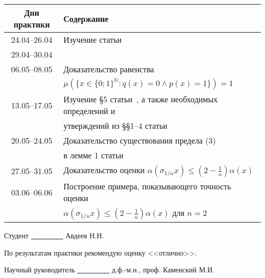 \documentclass[a4paper,openbib]{report}
\renewcommand{\leq}{\leqslant}
\begin{document}

\begin{center}
	\begin{tabular}{|c|l|}
		\hline
		\textbf{Дни практики} & \textbf{Содержание} \\
		\hline
		24.04--26.04 & Изучение статьи~\cite{connor1990almost} \\
		29.04--30.04 & \\
		\hline
		06.05--08.05 & Доказательство равенства \\
		             & $\mu (\{x\in\{0;1\}^\mathbb{N} : q(x) = 0 \wedge p(x)= 1\})=1$ \\
		\hline
		13.05--17.05 & Изучение \S 5 статьи~\cite{Semenov2014geomprops}, а также необходимых определений и\\
		             &  утверждений из \S\S 1--4 статьи~\cite{Semenov2014geomprops} \\
		\hline
		20.05--24.05 & Доказательство существования предела (3) \\
		             & в лемме 1 статьи~\cite{our-mz2019ac0} \\
		\hline
		27.05--31.05 & Доказательство оценки $\alpha(\sigma_{1/n} x) \leq \left( 2- \frac{1}{n} \right) \alpha(x)$ \\
		\hline
		03.06--06.06 & Построение примера, показывающего точность оценки \\
					 & $\alpha(\sigma_{1/n} x) \leq \left( 2- \frac{1}{n} \right) \alpha(x)$
					   для $n=2$ \\
		\hline
	\end{tabular}
\end{center}

\begingroup
	\let\clearpage\relax
	\printbibliography[title={\large Список литературы}]
\endgroup

\vspace{1em}

Студент \underline{~~~~~~~~~} Авдеев Н.Н.

\vspace{2em}

По результатам практики рекомендую оценку <<отлично>>.

\vspace{1em}

Научный руководитель \underline{~~~~~~~~~} д.ф.-м.н., проф. Каменский М.И.
\end{document}
